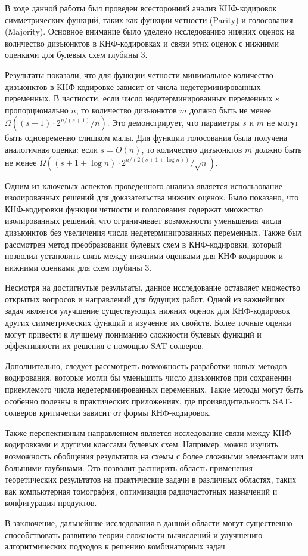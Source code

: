 
В ходе данной работы был проведен всесторонний анализ КНФ-кодировок симметрических функций, таких как функции четности (Parity) и голосования (Majority). Основное внимание было уделено исследованию нижних оценок на количество дизъюнктов в КНФ-кодировках и связи этих оценок с нижними оценками для булевых схем глубины 3.

Результаты показали, что для функции четности минимальное количество дизъюнктов в КНФ-кодировке зависит от числа недетерминированных переменных. В частности, если число недетерминированных переменных \( s \) пропорционально \( n \), то количество дизъюнктов \( m \) должно быть не менее \(\Omega((s+1) \cdot 2^{n/(s+1)}/n)\). Это демонстрирует, что параметры \( s \) и \( m \) не могут быть одновременно слишком малы. Для функции голосования была получена аналогичная оценка: если $s = O(n)$, то количество дизъюнктов \( m \) должно быть не менее \(\Omega((s+1 + \log n) \cdot 2^{n/(2(s+1 + \log n))}/\sqrt{n})\).

Одним из ключевых аспектов проведенного анализа является использование изолированных решений для доказательства нижних оценок. Было показано, что КНФ-кодировки функции четности и голосования содержат множество изолированных решений, что ограничивает возможности уменьшения числа дизъюнктов без увеличения числа недетерминированных переменных. Также был рассмотрен метод преобразования булевых схем в КНФ-кодировки, который позволил установить связь между нижними оценками для КНФ-кодировок и нижними оценками для схем глубины 3.

Несмотря на достигнутые результаты, данное исследование оставляет множество открытых вопросов и направлений для будущих работ. Одной из важнейших задач является улучшение существующих нижних оценок для КНФ-кодировок других симметрических функций и изучение их свойств. Более точные оценки могут привести к лучшему пониманию сложности булевых функций и эффективности их решения с помощью SAT-солверов.

Дополнительно, следует рассмотреть возможность разработки новых методов кодирования, которые могли бы уменьшить число дизъюнктов при сохранении приемлемого числа недетерминированных переменных. Такие методы могут быть особенно полезны в практических приложениях, где производительность SAT-солверов критически зависит от формы КНФ-кодировок.

Также перспективным направлением является исследование связи между КНФ-кодировками и другими классами булевых схем. Например, можно изучить возможность обобщения результатов на схемы с более сложными элементами или большими глубинами. Это позволит расширить область применения теоретических результатов на практические задачи в различных областях, таких как компьютерная томография, оптимизация радиочастотных назначений и конфигурация продуктов.

В заключение, дальнейшие исследования в данной области могут существенно способствовать развитию теории сложности вычислений и улучшению алгоритмических подходов к решению комбинаторных задач.